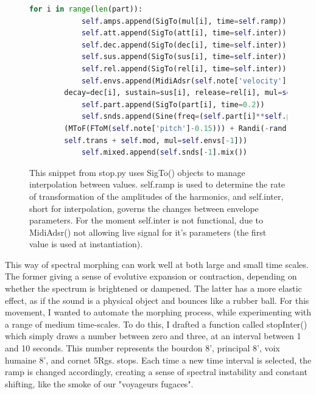 \documentclass[12pt,twoside,maitrise]{dms_ks}
\theoremstyle{definition}
\begin{document}
\begin{figure}[H]
\begin{lstlisting}[language=Python]
        for i in range(len(part)):
            self.amps.append(SigTo(mul[i], time=self.ramp))
            self.att.append(SigTo(att[i], time=self.inter))
            self.dec.append(SigTo(dec[i], time=self.inter))
            self.sus.append(SigTo(sus[i], time=self.inter))
            self.rel.append(SigTo(rel[i], time=self.inter))
            self.envs.append(MidiAdsr(self.note['velocity'], attack=att[i],
	    decay=dec[i], sustain=sus[i], release=rel[i], mul=self.amps[-1]))
            self.part.append(SigTo(part[i], time=0.2))
            self.snds.append(Sine(freq=(self.part[i]**self.partSc) * 
	    (MToF(FToM(self.note['pitch']-0.15))) + Randi(-rand, rand, 5) + 
	    self.trans + self.mod, mul=self.envs[-1]))
            self.mixed.append(self.snds[-1].mix())
\end{lstlisting}
\caption{This snippet from stop.py uses SigTo() objects to manage interpolation between values.
self.ramp is used to determine the rate of transformation of the amplitudes of the harmonics, and self.inter, short for interpolation, governs the changes between envelope parameters.
For the moment self.inter is not functional, due to MidiAdsr() not allowing live signal for it's parameters (the first value is used at instantiation).} 
\end{figure}

This way of spectral morphing can work well at both large and small time scales.
The former giving a sense of evolutive expansion or contraction, depending on whether the spectrum is brightened or dampened.
The latter has a more elastic effect, as if the sound is a physical object and bounces like a rubber ball.
For this movement, I wanted to automate the morphing process, while experimenting with a range of medium time-scales.
To do this, I drafted a function called stopInter() which simply draws a number between zero and three, at an interval between 1 and 10 seconds.
This number represents the bourdon 8', principal 8', voix humaine 8', and cornet 5Rgs.
stops.
Each time a new time interval is selected, the ramp is changed accordingly, creating a sense of spectral instability and constant shifting, like the smoke of our "voyageurs fugaces".
\end{document}
